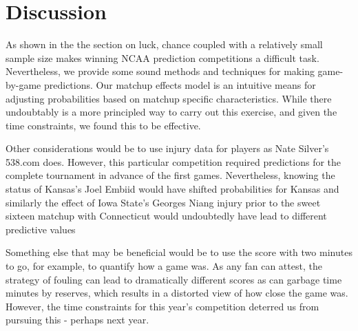 \section{Discussion}
As shown in the the section on luck, chance coupled with a relatively small sample size makes winning NCAA prediction competitions a difficult task.  Nevertheless, we provide some sound methods and techniques for making game-by-game predictions. Our matchup effects model is an intuitive means for adjusting probabilities based on matchup specific characteristics. While there undoubtably is a more principled way to carry out this exercise, and given the time constraints, we found this to be effective.

Other considerations would be to use injury data for players as Nate Silver's 538.com does. However, this particular competition required predictions for the complete tournament in advance of the first games. Nevertheless, knowing the status of Kansas's Joel Embiid would have shifted probabilities for Kansas and similarly the effect of Iowa State's Georges Niang injury prior to the sweet sixteen matchup with Connecticut would undoubtedly have lead to different predictive values

Something else that may be beneficial would be to use the score with two minutes to go, for example, to quantify how a game was. As any fan can attest, the strategy of fouling can lead to dramatically different scores as can garbage time minutes by reserves, which results in a distorted view of how close the game was. However, the time constraints for this year's competition deterred us from pursuing this - perhaps next year.

